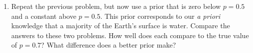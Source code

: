 \documentclass[10pt]{article}
\begin{document}
\begin{enumerate}
\begin{enumerate}
    \end{enumerate}

    

    \item Repeat the previous problem, but now use a prior that is zero below $p=0.5$ and a constant above $p=0.5$.  This prior corresponds to our \emph{a priori} knowledge that a majority of the Earth's surface is water.  Compare the answers to these two problems.  How well does each compare to the true value of $p=0.7$?  What difference does a better prior make?  
\end{enumerate}  
\end{document}

